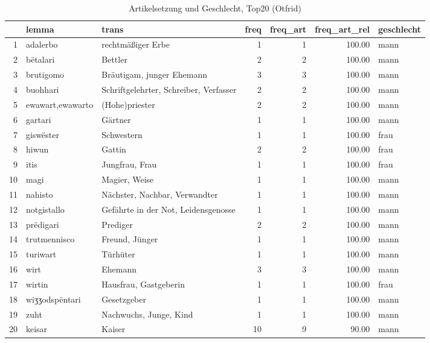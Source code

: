 \begin{table}[ht]
\centering
\begin{tabular}{rllrrrl}
  \hline
 & lemma & trans & freq & freq\_art & freq\_art\_rel & geschlecht \\ 
  \hline
1 & adalerbo & rechtmäßiger Erbe &   1 &   1 & 100.00 & mann \\ 
  2 & bëtalari & Bettler &   2 &   2 & 100.00 & mann \\ 
  3 & brutigomo & Bräutigam, junger Ehemann &   3 &   3 & 100.00 & mann \\ 
  4 & buohhari & Schriftgelehrter, Schreiber, Verfasser &   2 &   2 & 100.00 & mann \\ 
  5 & ewawart,ewawarto & (Hohe)priester &   2 &   2 & 100.00 & mann \\ 
  6 & gartari & Gärtner &   1 &   1 & 100.00 & mann \\ 
  7 & giswëster & Schwestern &   1 &   1 & 100.00 & frau \\ 
  8 & hiwun & Gattin &   2 &   2 & 100.00 & frau \\ 
  9 & itis & Jungfrau, Frau &   1 &   1 & 100.00 & frau \\ 
  10 & magi & Magier, Weise &   1 &   1 & 100.00 & mann \\ 
  11 & nahisto & Nächster, Nachbar, Verwandter &   1 &   1 & 100.00 & mann \\ 
  12 & notgistallo & Gefährte in der Not, Leidensgenosse &   1 &   1 & 100.00 & mann \\ 
  13 & prëdigari & Prediger &   2 &   2 & 100.00 & mann \\ 
  14 & trutmennisco & Freund, Jünger &   1 &   1 & 100.00 & mann \\ 
  15 & turiwart & Türhüter &   1 &   1 & 100.00 & mann \\ 
  16 & wirt & Ehemann &   3 &   3 & 100.00 & mann \\ 
  17 & wirtin & Hausfrau, Gastgeberin &   1 &   1 & 100.00 & frau \\ 
  18 & wiʒʒodspëntari & Gesetzgeber &   1 &   1 & 100.00 & mann \\ 
  19 & zuht & Nachwuchs, Junge, Kind &   1 &   1 & 100.00 & mann \\ 
  20 & keisar & Kaiser &  10 &   9 & 90.00 & mann \\ 
   \hline
\end{tabular}
\caption{Artikelsetzung und Geschlecht, Top20  (Otfrid)} 
\end{table}
